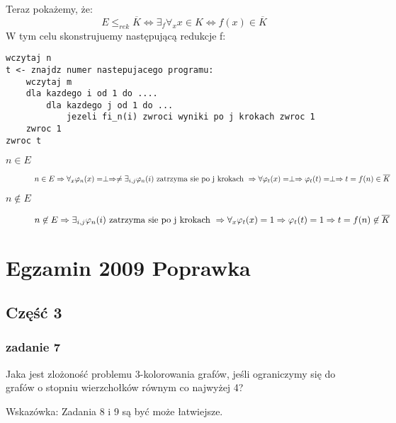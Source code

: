 \documentclass[svgnames]{report}
\begin{document}
Teraz pokażemy, że:
\begin{equation}
E \leqslant_{rek} \overline{K} \Leftrightarrow \exists_f \forall_{x} x \in K \Leftrightarrow f(x) \in \overline{K}
\end{equation}
W tym celu skonstrujuemy następującą redukcje f:
\begin{lstlisting}
wczytaj n
t <- znajdz numer nastepujacego programu:
	wczytaj m
	dla kazdego i od 1 do ....
		dla kazdego j od 1 do ...
			jezeli fi_n(i) zwroci wyniki po j krokach zwroc 1
	zwroc 1	
zwroc t
\end{lstlisting}
\begin{description}
	\item[$n \in E$]
		\begin{equation*}
			n \in E \Rightarrow \forall_x \varphi_n(x) = \perp \Rightarrow \neq \exists_{i,j} \varphi_n(i) \hbox{ zatrzyma sie po j krokach } \Rightarrow \forall \varphi_t(x) = \perp \Rightarrow \varphi_t(t) = \perp \Rightarrow t = f(n) \in \overline{K}
		\end{equation*}
	\item[$n \not\in E$]
		\begin{equation*}
			n \not\in E \Rightarrow \exists_{i,j} \varphi_n(i) \hbox{ zatrzyma sie po j krokach } \Rightarrow \forall_x \varphi_t(x) = 1 \Rightarrow \varphi_t(t) = 1 \Rightarrow t = f(n) \not\in \overline{K}
		\end{equation*}
\end{description}


\chapter{Egzamin 2009 Poprawka}
\section{Część 3}
\subsection{zadanie 7}
\begin{framed}
Jaka jest zlożoność problemu 3-kolorowania grafów, jeśli ograniczymy się do grafów o stopniu wierzchołków równym co najwyżej 4?

Wskazówka: Zadania 8 i 9 są być może łatwiejsze.
\end{framed}
\end{document}
